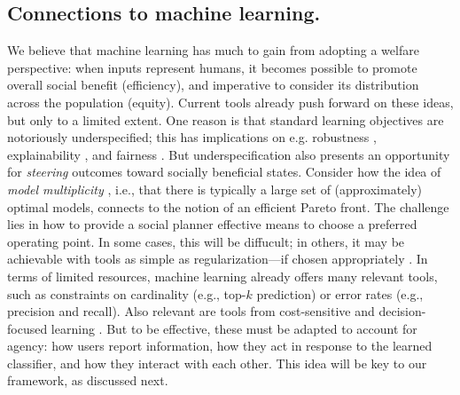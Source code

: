 
\subsection{Connections to machine learning.}
We believe that machine learning has much to gain from adopting a welfare perspective:
when inputs represent humans, it becomes 
possible to promote overall social benefit (efficiency),
and imperative to consider its distribution across the population (equity).
Current tools already push forward on these ideas, but only to a limited extent.
One reason is that standard learning objectives are notoriously underspecified;
this has implications on e.g. robustness \citep{d2022underspecification},
explainability \citep[see][]{rudin2019stop},
and fairness \citep[e.g.,][]{rodolfa2020case,coston2021characterizing,black2022model}.
But underspecification also presents an opportunity for \emph{steering} outcomes toward socially beneficial states.
Consider how the idea of \emph{model multiplicity}
\citep{breiman2001statistical,marx2020predictive,hsu2022rashomon},
i.e., that there is typically a large set of (approximately) optimal models,
connects to the notion of an efficient Pareto front.%
The challenge lies in how to provide a social planner effective means to choose a preferred operating point.
In some cases, this will be diffucult;
in others, it may be achievable with tools as simple as regularization---if chosen appropriately \citep{levanon2021strategic}.
In terms of limited resources, machine learning already offers many 
relevant tools, such as constraints on cardinality (e.g., top-$k$ prediction)
or error rates (e.g., precision and recall).
Also relevant are tools from cost-sensitive \citep[e.g.,][]{elkan2001foundations}
and decision-focused learning \citep{mandi2024decision}.
But to be effective, these must be adapted to account for agency:
how users report information,
how they act in response to the learned classifier,
and how they interact with each other.
This idea will be key to our framework, as discussed next.





